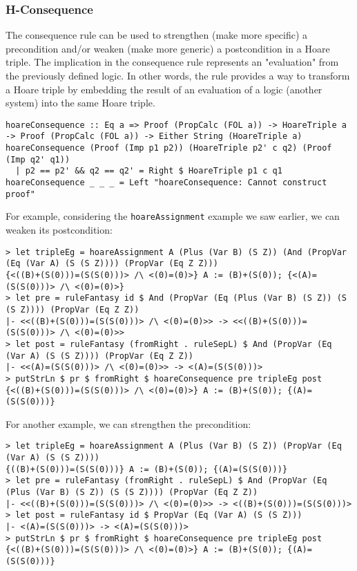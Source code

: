 \documentclass{article}
\begin{document}
\subsubsection{H-Consequence}

The consequence rule can be used to strengthen (make more specific) a precondition and/or weaken (make more generic) a postcondition in a Hoare triple. The implication in the consequence rule represents an "evaluation" from the previously defined logic. In other words, the rule provides a way to transform a Hoare triple by embedding the result of an evaluation of a logic (another system) into the same Hoare triple.

\begin{lstlisting}
hoareConsequence :: Eq a => Proof (PropCalc (FOL a)) -> HoareTriple a -> Proof (PropCalc (FOL a)) -> Either String (HoareTriple a)
hoareConsequence (Proof (Imp p1 p2)) (HoareTriple p2' c q2) (Proof (Imp q2' q1))
  | p2 == p2' && q2 == q2' = Right $ HoareTriple p1 c q1
hoareConsequence _ _ _ = Left "hoareConsequence: Cannot construct proof"
\end{lstlisting}

For example, considering the \texttt{hoareAssignment} example we saw earlier, we can weaken its postcondition:

\begin{lstlisting}
> let tripleEg = hoareAssignment A (Plus (Var B) (S Z)) (And (PropVar (Eq (Var A) (S (S Z)))) (PropVar (Eq Z Z)))
{<((B)+(S(0)))=(S(S(0)))> /\ <(0)=(0)>} A := (B)+(S(0)); {<(A)=(S(S(0)))> /\ <(0)=(0)>}
> let pre = ruleFantasy id $ And (PropVar (Eq (Plus (Var B) (S Z)) (S (S Z)))) (PropVar (Eq Z Z))
|- <<((B)+(S(0)))=(S(S(0)))> /\ <(0)=(0)>> -> <<((B)+(S(0)))=(S(S(0)))> /\ <(0)=(0)>>
> let post = ruleFantasy (fromRight . ruleSepL) $ And (PropVar (Eq (Var A) (S (S Z)))) (PropVar (Eq Z Z))
|- <<(A)=(S(S(0)))> /\ <(0)=(0)>> -> <(A)=(S(S(0)))>
> putStrLn $ pr $ fromRight $ hoareConsequence pre tripleEg post
{<((B)+(S(0)))=(S(S(0)))> /\ <(0)=(0)>} A := (B)+(S(0)); {(A)=(S(S(0)))}
\end{lstlisting}

For another example, we can strengthen the precondition:

\begin{lstlisting}
> let tripleEg = hoareAssignment A (Plus (Var B) (S Z)) (PropVar (Eq (Var A) (S (S Z))))
{((B)+(S(0)))=(S(S(0)))} A := (B)+(S(0)); {(A)=(S(S(0)))}
> let pre = ruleFantasy (fromRight . ruleSepL) $ And (PropVar (Eq (Plus (Var B) (S Z)) (S (S Z)))) (PropVar (Eq Z Z))
|- <<((B)+(S(0)))=(S(S(0)))> /\ <(0)=(0)>> -> <((B)+(S(0)))=(S(S(0)))>
> let post = ruleFantasy id $ PropVar (Eq (Var A) (S (S Z)))
|- <(A)=(S(S(0)))> -> <(A)=(S(S(0)))>
> putStrLn $ pr $ fromRight $ hoareConsequence pre tripleEg post
{<((B)+(S(0)))=(S(S(0)))> /\ <(0)=(0)>} A := (B)+(S(0)); {(A)=(S(S(0)))}
\end{lstlisting}
\end{document}
